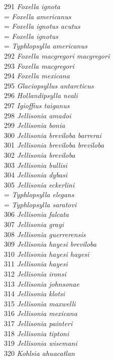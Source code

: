 \documentclass[
]{article}
\begin{document}
291 \emph{Foxella ignota}\\
= \emph{Foxella americanus}\\
= \emph{Foxella ignotus acutus}\\
= \emph{Foxella ignotus}\\
= \emph{Typhlopsylla americanus}\\
292 \emph{Foxella macgregori macgregori}\\
293 \emph{Foxella macgregori}\\
294 \emph{Foxella mexicana}\\
295 \emph{Glaciopsyllus antarcticus}\\
296 \emph{Hollandipsylla neali}\\
297 \emph{Igioffius taiganus}\\
298 \emph{Jellisonia amadoi}\\
299 \emph{Jellisonia bonia}\\
300 \emph{Jellisonia breviloba barrerai}\\
301 \emph{Jellisonia breviloba breviloba}\\
302 \emph{Jellisonia breviloba}\\
303 \emph{Jellisonia bullisi}\\
304 \emph{Jellisonia dybasi}\\
305 \emph{Jellisonia eckerlini}\\
= \emph{Typhlopsylla elegans}\\
= \emph{Typhlopsylla saratovi}\\
306 \emph{Jellisonia falcata}\\
307 \emph{Jellisonia grayi}\\
308 \emph{Jellisonia guerrerensis}\\
309 \emph{Jellisonia hayesi breviloba}\\
310 \emph{Jellisonia hayesi hayesi}\\
311 \emph{Jellisonia hayesi}\\
312 \emph{Jellisonia ironsi}\\
313 \emph{Jellisonia johnsonae}\\
314 \emph{Jellisonia klotsi}\\
315 \emph{Jellisonia maxwelli}\\
316 \emph{Jellisonia mexicana}\\
317 \emph{Jellisonia painteri}\\
318 \emph{Jellisonia tiptoni}\\
319 \emph{Jellisonia wisemani}\\
320 \emph{Kohlsia ahuacatlan}\\
\end{document}
